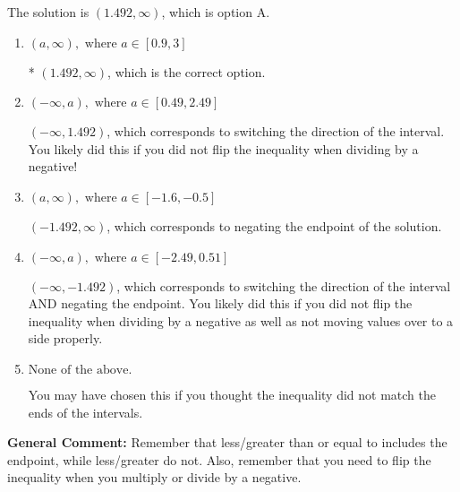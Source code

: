 \documentclass{extbook}[14pt]
\begin{document}
\begin{enumerate}
{The solution is \( (1.492, \infty) \), which is option A.\begin{enumerate}[label=\Alph*.]
\item \( (a, \infty), \text{ where } a \in [0.9, 3] \)

* $(1.492, \infty)$, which is the correct option.
\item \( (-\infty, a), \text{ where } a \in [0.49, 2.49] \)

 $(-\infty, 1.492)$, which corresponds to switching the direction of the interval. You likely did this if you did not flip the inequality when dividing by a negative!
\item \( (a, \infty), \text{ where } a \in [-1.6, -0.5] \)

 $(-1.492, \infty)$, which corresponds to negating the endpoint of the solution.
\item \( (-\infty, a), \text{ where } a \in [-2.49, 0.51] \)

 $(-\infty, -1.492)$, which corresponds to switching the direction of the interval AND negating the endpoint. You likely did this if you did not flip the inequality when dividing by a negative as well as not moving values over to a side properly.
\item \( \text{None of the above}. \)

You may have chosen this if you thought the inequality did not match the ends of the intervals.
\end{enumerate}

\textbf{General Comment:} Remember that less/greater than or equal to includes the endpoint, while less/greater do not. Also, remember that you need to flip the inequality when you multiply or divide by a negative.
}
\end{enumerate}
\end{document}
